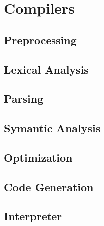 \chapter{Compilers}

\section{Preprocessing}
\section{Lexical Analysis}
\section{Parsing}
\section{Symantic Analysis}
\section{Optimization}
\section{Code Generation}

\section{Interpreter}
